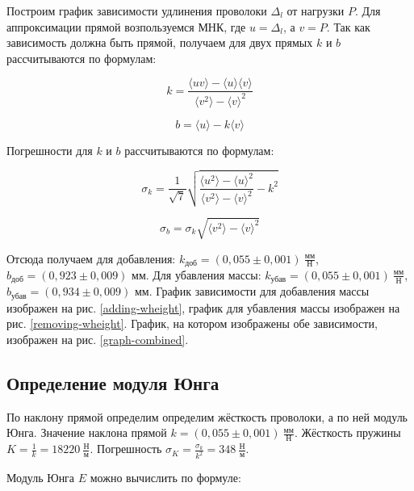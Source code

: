 \documentclass[a4paper,12pt]{article}
\begin{document}
Построим график зависимости удлинения проволоки $\Delta_l$ от нагрузки $P$. Для аппроксимации прямой возпользуемся МНК, где $u = \Delta_l$, а $v = P$. Так как зависимость должна быть прямой, получаем для двух прямых $k$ и $b$ рассчитываются по формулам:

\begin{equation}
    k = \frac{\langle uv\rangle - \langle u \rangle \langle v \rangle}{\langle v^2 \rangle - \langle v \rangle^2}
\end{equation}

\begin{equation}
    b = \langle u \rangle - k\langle v \rangle
\end{equation}

Погрешности для $k$ и $b$ рассчитываются по формулам:

\begin{equation}
    \sigma_k = \frac{1}{\sqrt{7}} \sqrt{\frac{\langle u^2 \rangle - \langle u \rangle^2}{\langle v^2 \rangle - \langle v \rangle^2} - k^2}
\end{equation}

\begin{equation}
    \sigma_b = \sigma_k\sqrt{\langle v^2 \rangle - \langle v \rangle^2}
\end{equation}

Отсюда получаем для добавления: $k_\text{доб} = (0,055 \pm 0,001) \ \frac{\text{мм}}{\text{Н}}$, $b_\text{доб} = (0,923 \pm 0,009) \text{ мм}$. Для убавления массы: $k_\text{убав} = (0,055 \pm 0,001) \ \frac{\text{мм}}{\text{Н}}$, $b_\text{убав} = (0,934 \pm 0,009) \text{ мм}$. График зависимости для добавления массы изображен на рис. \ref{adding-wheight}, график для убавления массы изображен на рис. \ref{removing-wheight}. График, на котором изображены обе зависимости, изображен на рис. \ref{graph-combined}.

\subsection{Определение модуля Юнга}

По наклону прямой определим определим жёсткость проволоки, а по ней модуль Юнга. Значение наклона прямой $k = (0,055 \pm 0,001) \ \frac{\text{мм}}{\text{Н}}$. Жёсткость пружины $K = \frac{1}{k} = 18220 \ \frac{\text{Н}}{\text{м}}$. Погрешность $\sigma_K = \frac{\sigma_k}{k^2} = 348 \ \frac{\text{Н}}{\text{м}}$.

Модуль Юнга $E$ можно вычислить по формуле:
\end{document}
